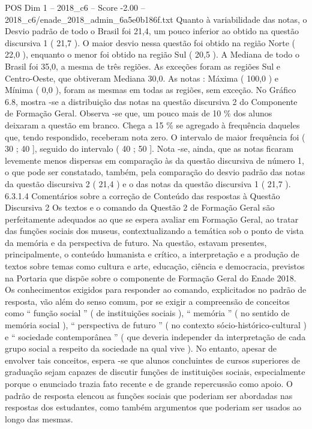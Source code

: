 \begin{textsample}{POS Dim 1 – 2018\_c6 – Score -2.00 – 2018\_c6/enade\_2018\_admin\_6a5e0b186f.txt}
Quanto à variabilidade das notas, o Desvio padrão de todo o Brasil foi 21,4, um pouco inferior ao obtido na questão discursiva 1 ( 21,7 ).
O maior desvio nessa questão foi obtido na região Norte ( 22,0 ), enquanto o menor foi obtido na região Sul ( 20,5 ).
A Mediana de todo o Brasil foi 35,0, a mesma de três regiões.
As exceções foram as regiões Sul e Centro-Oeste, que obtiveram Mediana 30,0.
As notas : Máxima ( 100,0 ) e Mínima ( 0,0 ), foram as mesmas em todas as regiões, sem exceção.
No Gráfico 6.8, mostra -se a distribuição das notas na questão discursiva 2 do Componente de Formação Geral.
Observa -se que, um pouco mais de 10 \% dos alunos deixaram a questão em branco.
Chega a 15 \% se agregado à frequência daqueles que, tendo respondido, receberam nota zero.
O intervalo de maior frequência foi ( 30 ; 40 ], seguido do intervalo ( 40 ; 50 ].
Nota -se, ainda, que as notas ficaram levemente menos dispersas em comparação às da questão discursiva de número 1, o que pode ser constatado, também, pela comparação do desvio padrão das notas da questão discursiva 2 ( 21,4 ) e o das notas da questão discursiva 1 ( 21,7 ). 6.3.1.4 Comentários sobre a correção de Conteúdo das respostas à Questão Discursiva 2 Os textos e o comando da Questão 2 de Formação Geral são perfeitamente adequados ao que se espera avaliar em Formação Geral, ao tratar das funções sociais dos museus, contextualizando a temática sob o ponto de vista da memória e da perspectiva de futuro.
Na questão, estavam presentes, principalmente, o conteúdo humanista e crítico, a interpretação e a produção de textos sobre temas como cultura e arte, educação, ciência e democracia, previstos na Portaria que dispõe sobre o componente de Formação Geral do Enade 2018.
Os conhecimentos exigidos para responder ao comando, explicitados no padrão de resposta, vão além do senso comum, por se exigir a compreensão de conceitos como “ função social ” ( de instituições sociais ), “ memória ” ( no sentido de memória social ), “ perspectiva de futuro ” ( no contexto sócio-histórico-cultural ) e “ sociedade contemporânea ” ( que deveria independer da interpretação de cada grupo social a respeito da sociedade na qual vive ).
No entanto, apesar de envolver tais conceitos, espera -se que alunos concluintes de cursos superiores de graduação sejam capazes de discutir funções de instituições sociais, especialmente porque o enunciado trazia fato recente e de grande repercussão como apoio.
O padrão de resposta elencou as funções sociais que poderiam ser abordadas nas respostas dos estudantes, como também argumentos que poderiam ser usados ao longo das mesmas.

\end{textsample}
